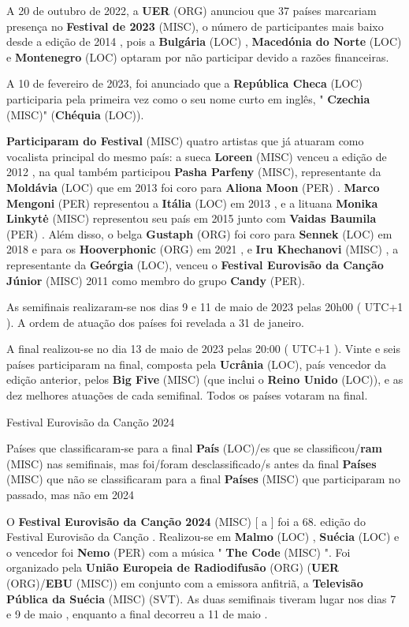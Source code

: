 \documentclass[12pt,a4paper]{article}
\begin{document}
A 20 de outubro de 2022, a \textbf{UER} (ORG) anunciou que 37 países marcariam presença no \textbf{Festival de 2023} (MISC), o número de participantes mais baixo desde a edição de 2014 , pois a \textbf{Bulgária} (LOC) , \textbf{Macedónia do Norte} (LOC) e \textbf{Montenegro} (LOC) optaram por não participar devido a razões financeiras.

A 10 de fevereiro de 2023, foi anunciado que a \textbf{República Checa} (LOC) participaria pela primeira vez como o seu nome curto em inglês, " \textbf{Czechia} (MISC)" (\textbf{Chéquia} (LOC)).

\textbf{Participaram do Festival} (MISC) quatro artistas que já atuaram como vocalista principal do mesmo país: a sueca \textbf{Loreen} (MISC) venceu a edição de 2012 , na qual também participou \textbf{Pasha Parfeny} (MISC), representante da \textbf{Moldávia} (LOC) que em 2013 foi coro para \textbf{Aliona Moon} (PER) . \textbf{Marco Mengoni} (PER) representou a \textbf{Itália} (LOC) em 2013 , e a lituana \textbf{Monika Linkytė} (MISC) representou seu país em 2015 junto com \textbf{Vaidas Baumila} (PER) . Além disso, o belga \textbf{Gustaph} (ORG) foi coro para \textbf{Sennek} (LOC) em 2018 e para os \textbf{Hooverphonic} (ORG) em 2021 , e \textbf{Iru Khechanovi} (MISC) , a representante da \textbf{Geórgia} (LOC), venceu o \textbf{Festival Eurovisão da Canção Júnior} (MISC) 2011 como membro do grupo \textbf{Candy} (PER).

As semifinais realizaram-se nos dias 9 e 11 de maio de 2023 pelas 20h00 ( UTC+1 ). A ordem de atuação dos países foi revelada a 31 de janeiro.

A final realizou-se no dia 13 de maio de 2023 pelas 20:00 ( UTC+1 ). Vinte e seis países participaram na final, composta pela \textbf{Ucrânia} (LOC), país vencedor da edição anterior, pelos \textbf{Big Five} (MISC) (que inclui o \textbf{Reino Unido} (LOC)), e as dez melhores atuações de cada semifinal. Todos os países votaram na final.



Festival Eurovisão da Canção 2024



Países que classificaram-se para a final \textbf{País} (LOC)/es que se classificou/\textbf{ram} (MISC) nas semifinais, mas foi/foram desclassificado/s antes da final \textbf{Países} (MISC) que não se classificaram para a final \textbf{Países} (MISC) que participaram no passado, mas não em 2024

O \textbf{Festival Eurovisão da Canção 2024} (MISC) [ a ] foi a 68. edição do Festival Eurovisão da Canção . Realizou-se em \textbf{Malmo} (LOC) , \textbf{Suécia} (LOC) e o vencedor foi \textbf{Nemo} (PER) com a música " \textbf{The Code} (MISC) ". Foi organizado pela \textbf{União Europeia de Radiodifusão} (ORG) (\textbf{UER} (ORG)/\textbf{EBU} (MISC)) em conjunto com a emissora anfitriã, a \textbf{Televisão Pública da Suécia} (MISC) (SVT). As duas semifinais tiveram lugar nos dias 7 e 9 de maio , enquanto a final decorreu a 11 de maio .
\end{document}
